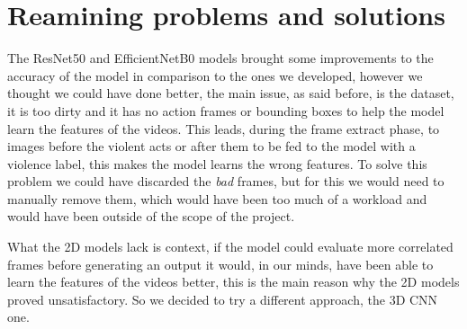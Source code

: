 \section{Reamining problems and solutions}
The ResNet50 and EfficientNetB0 models brought some improvements to the accuracy of the model in comparison to the ones we developed, however we thought we could have done better, the main issue, as said before, is the dataset, it is too dirty and it has no action frames or bounding boxes to help the model learn the features of the videos. This leads, during the frame extract phase, to images before the violent acts or after them to be fed to the model with a violence label, this makes the model learns the wrong features. To solve this problem we could have discarded the \textit{bad} frames, but for this we would need to manually remove them, which would have been too much of a workload and would have been outside of the scope of the project.

What the 2D models lack is context, if the model could evaluate more correlated frames before generating an output it would, in our minds, have been able to learn the features of the videos better, this is the main reason why the 2D models proved unsatisfactory. So we decided to try a different approach, the 3D CNN one.
